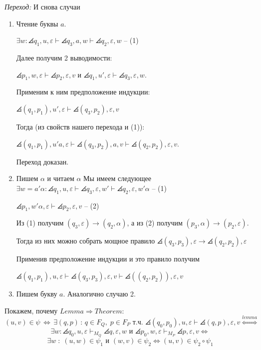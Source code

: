 \textit{Переход:} И снова случаи
\begin{enumerate}
    \item Чтение буквы $a$.
    
    $\exists w: \angles{q_1, u, \varepsilon} \vdash \angles{q_3, a, w} \vdash \angles{q_2, \varepsilon, w}$ -- (1)
    
    Далее получим 2 выводимости:
    
    $\angles{p_1, w, \varepsilon} \vdash \angles{p_2, \varepsilon, v}$ и $\angles{q_1, u', \varepsilon} \vdash \angles{q_3, \varepsilon, w}$.
    
    Применим к ним предположение индукции:
    
    $\angles{(q_1, p_1), u', \varepsilon} \vdash \angles{(q_3, p_2), \varepsilon, v}$
    
    Тогда (из свойств нашего перехода и (1)):
    
    $\angles{(q_1, p_1), u'a, \varepsilon} \vdash \angles{(q_3, p_2), a, v} \vdash \angles{(q_2, p_2), \varepsilon, v}$.
    
    Переход доказан.
    \item Пишем $\alpha$ и читаем $\alpha$ 
    Мы имеем следующее 
    $\exists w = a'\alpha: \angles{q_1, u, \varepsilon} \vdash \angles{q_3, \varepsilon, w'} \vdash \angles{q_2, \varepsilon, w'\alpha}$ -- (1)
    
    $\angles{p_1, w'\alpha, \varepsilon} \vdash \angles{p_2, \varepsilon, v}$ -- (2)
    
    Из (1) получим $(q_3, \varepsilon) \rightarrow (q_2, \alpha)$, а из (2) получим $(p_3, \alpha) \rightarrow (p_2, \varepsilon)$.
    
    Тогда из них можно собрать мощное правило $\angles{(q_3, p_3), \varepsilon} \rightarrow \angles{(q_2, p_2), \varepsilon}$
    
    Применив предположение индукции и это правило получим
    
    $\angles{(q_1, p_1), u, \varepsilon} \vdash \angles{(q_3, p_3), \varepsilon, v} \vdash \angles{((q_2, p_2)), \varepsilon, v}$
    \item Пишем букву $a$. Аналогично случаю 2.
\end{enumerate}
\EndProof

Покажем, почему $Lemma \Longrightarrow Theorem$:
$$
(u,v) \in \psi \,\Longleftrightarrow \,\exists (q,p) \, : \, q\in F_Q,\; p\in F_P \text{ т.ч. } \angles{(q_0, p_0), u, \varepsilon} \vdash \angles{(q, p), \varepsilon, v} \overset{lemma}{\Longleftrightarrow}
$$
$$
\exists w : \angles{q_0, u, \varepsilon} \vdash_{M_Q} \angles{q,\varepsilon, w} \text{ и } \angles{p_0, w, \varepsilon} \vdash_{M_P} \angles{p,\varepsilon, v} \Longleftrightarrow
$$
$$
\exists w \; : \; (u,w)\in \psi_1 \text{ и } (w,v)\in \psi_2 \Longleftrightarrow (u,v) \in \psi_2 \circ \psi_1
$$
\EndProof
